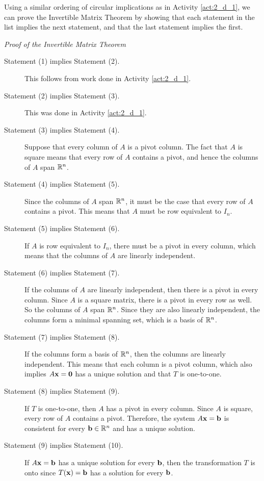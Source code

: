 Using a similar ordering of circular implications as in Activity \ref{act:2_d_1}, we can prove the Invertible Matrix Theorem by showing that each statement in the list implies the next statement, and that the last statement implies the first. 



\noindent \emph{Proof of the Invertible Matrix Theorem}

\begin{description}
\item[Statement (1) implies Statement (2).] This follows from work done in Activity \ref{act:2_d_1}. 
\item[Statement (2) implies Statement (3).] This was done in Activity \ref{act:2_d_1}. 
\item[Statement (3) implies Statement (4).] Suppose that every column of $A$ is a pivot column. The fact that $A$ is square means that every row of $A$ contains a pivot, and hence the columns of $A$ span $\mathbb{R}^n$.
\item[Statement (4) implies Statement (5).] Since the columns of $A$ span $\mathbb{R}^n$, it must be the case that every row of $A$ contains a pivot. This means that $A$ must be row equivalent to $I_n$. 
\item[Statement (5) implies Statement (6).] If $A$ is row equivalent to $I_n$, there must be a pivot in every column, which means that the columns of $A$ are linearly independent.
\item[Statement (6) implies Statement (7).] If the columns of $A$ are linearly independent, then there is a pivot in every column. Since $A$ is a square matrix, there is a pivot in every row as well. So the columns of $A$ span $\mathbb{R}^n$. Since they are also linearly independent, the columns form a minimal spanning set, which is a basis of $\mathbb{R}^n$.
\item[Statement (7) implies Statement (8).] If the columns form a basis of $\mathbb{R}^n$, then the columns are linearly independent. This means that each column is a pivot column, which also implies $A\mathbf{x}=\mathbf{0}$ has a unique solution and that $T$ is one-to-one.
\item[Statement (8) implies Statement (9).] If $T$ is one-to-one, then $A$ has a pivot in every column. Since $A$ is square, every row of $A$ contains a pivot. Therefore, the system $A \mathbf{x} = \mathbf{b}$ is consistent for every $\mathbf{b} \in \mathbb{R}^n$ and has a unique solution.
\item[Statement (9) implies Statement (10).] If $A\mathbf{x}=\mathbf{b}$ has a unique solution for every $\mathbf{b}$, then the transformation $T$ is onto since $T(\mathbf{x})=\mathbf{b}$ has a solution for every $\mathbf{b}$.

\end{description}
